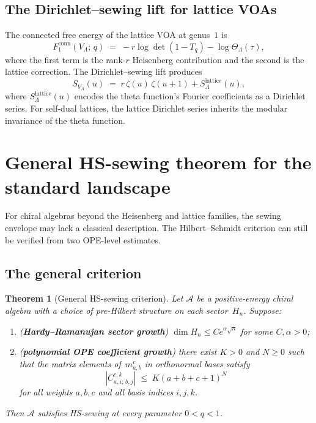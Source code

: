 \documentclass[11pt,reqno]{amsart}
\newtheorem{theorem}{Theorem}[section]
\theoremstyle{definition}
\theoremstyle{remark}
\newcommand{\cA}{\mathcal{A}}
\numberwithin{equation}{section}
\begin{document}
\subsection{The Dirichlet--sewing lift for
 lattice VOAs}\label{subsec:lattice-dirichlet}

The connected free energy of the lattice VOA at genus~$1$ is
\begin{equation}\label{eq:lattice-f1}
F_1^{\mathrm{conn}}(V_\Lambda;\,q)
\;=\;
-r\log\det(1 - T_q)
- \log\Theta_\Lambda(\tau),
\end{equation}
where the first term is the rank-$r$ Heisenberg contribution
and the second is the lattice correction.  The Dirichlet--sewing
lift produces
\begin{equation}\label{eq:lattice-dirichlet}
S_{V_\Lambda}(u)
\;=\;
r\,\zeta(u)\,\zeta(u+1)
+ S_\Lambda^{\mathrm{lattice}}(u),
\end{equation}
where $S_\Lambda^{\mathrm{lattice}}(u)$ encodes the theta
function's Fourier coefficients as a Dirichlet series.  For
self-dual lattices, the lattice Dirichlet series inherits the
modular invariance of the theta function.



\section{General HS-sewing theorem for the standard landscape}
\label{sec:general-criterion}

For chiral algebras beyond the Heisenberg and lattice families,
the sewing envelope may lack a classical description.  The
Hilbert--Schmidt criterion can still be verified from two OPE-level
estimates.

\subsection{The general criterion}\label{subsec:general-criterion}

\begin{theorem}[General HS-sewing criterion]
\label{thm:general-hs-sewing}
Let $\cA$ be a positive-energy chiral algebra with a choice of
pre-Hilbert structure on each sector~$H_n$.  Suppose:
\begin{enumerate}[label=\textup{(\roman*)}]
\item \textup{(\textbf{Hardy--Ramanujan sector growth})}\;
$\dim H_n \leq C e^{\alpha\sqrt{n}}$ for some
$C, \alpha > 0$;
\item \textup{(\textbf{polynomial OPE coefficient growth})}\;
there exist $K > 0$ and $N \geq 0$ such that the matrix
elements of~$m_{a,b}^c$ in orthonormal bases satisfy
\[
|C^{c,k}_{a,i;\,b,j}|
\;\leq\;
K(a + b + c + 1)^N
\]
for all weights $a,b,c$ and all basis indices $i,j,k$.
\end{enumerate}
Then $\cA$ satisfies HS-sewing at every parameter
$0 < q < 1$.
\end{theorem}
\end{document}
